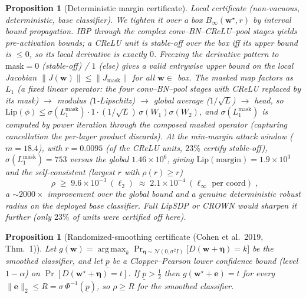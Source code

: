 \documentclass[11pt]{article}
\newtheorem{proposition}[theorem]{Proposition}
\theoremstyle{definition}
\newcommand{\norm}[1]{\lVert #1 \rVert}
\newcommand{\bw}{\bm{w}}
\DeclareMathOperator*{\argmax}{arg\,max}
\begin{document}
\begin{proposition}[Deterministic margin certificate]
\emph{Local certificate (non-vacuous, deterministic, base classifier).} We tighten it over a
box $B_\infty(\bw^\star,r)$ by interval bound propagation. IBP through the complex
conv--BN--CReLU--pool stages yields pre-activation bounds; a CReLU unit is \emph{stable-off}
over the box iff its upper bound is $\le0$, so its local derivative is exactly $0$. Freezing
the derivative pattern to $\mathrm{mask}=0$ (stable-off) / $1$ (else) gives a valid entrywise
upper bound on the local Jacobian $\lVert J(\bw)\rVert\le\lVert J_{\mathrm{mask}}\rVert$ for all
$\bw\in$ box. The masked map factors as $L_1$ (a fixed linear operator: the four
conv--BN--pool stages with CReLU replaced by its mask) $\to$ modulus ($1$-Lipschitz) $\to$
global average ($1/\sqrt{L}$) $\to$ head, so
$\mathrm{Lip}(\phi)\le\sigma(L_1^{\mathrm{mask}})\cdot 1\cdot(1/\sqrt L)\,\sigma(W_1)\sigma(W_2)$,
and $\sigma(L_1^{\mathrm{mask}})$ is computed by power iteration through the \emph{composed}
masked operator (capturing cancellation the per-layer product discards). At the min-margin
attack window ($m=18.4$), with $r=0.0095$ (of the CReLU units, $23\%$ certify stable-off),
$\sigma(L_1^{\mathrm{mask}})=753$ versus the global $1.46\times10^{6}$, giving
$\mathrm{Lip}(\text{margin})=1.9\times10^{3}$ and the self-consistent (largest $r$ with
$\rho(r)\ge r$)
\[
  \boxed{\;\rho\;\ge\;9.6\times10^{-3}\ (\ell_2)\;\approx\;2.1\times10^{-4}\ (\ell_\infty\text{ per coord})\;},
\]
a $\sim\!2000\times$ improvement over the global bound and a genuine deterministic robust radius
on the deployed base classifier. Full LipSDP or CROWN would sharpen it further (only $23\%$ of
units were certified off here).
\end{proposition}

\begin{proposition}[Randomized-smoothing certificate {\normalfont(Cohen et al.\ 2019, Thm.~1)}]
\label{prop:rs}
Let $g(\bw)=\argmax_k \Pr_{\bm\eta\sim\mathcal N(0,\sigma^2 I)}\!\big[D(\bw+\bm\eta)=k\big]$ be
the smoothed classifier, and let $\underline p$ be a Clopper--Pearson lower confidence bound
(level $1-\alpha$) on $\Pr[D(\bw^\star+\bm\eta)=t]$. If $\underline p>\tfrac12$ then
$g(\bw^\star+\bm e)=t$ for every $\norm{\bm e}_2\le R=\sigma\,\Phi^{-1}(\underline p)$, so
$\rho\ge R$ for the smoothed classifier.
\end{proposition}
\end{document}
